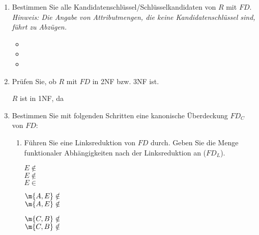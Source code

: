 \documentclass{bschlangaul-aufgabe}
\begin{document}
\begin{enumerate}


\item Bestimmen Sie alle Kandidatenschlüssel/Schlüsselkandidaten von $R$
mit $FD$. \textit{Hinweis: Die Angabe von Attributmengen, die keine
Kandidatenschlüssel sind, führt zu Abzügen.}

\begin{bAntwort}
\begin{itemize}
\item {}
\item {}
\item {}
\end{itemize}
\end{bAntwort}


\item Prüfen Sie, ob $R$ mit $FD$ in 2NF bzw. 3NF ist.

\begin{bAntwort}
$R$ ist in 1NF, da 
\end{bAntwort}


\item Bestimmen Sie mit folgenden Schritten eine kanonische Überdeckung
$FD_C$ von $FD$:

\begin{enumerate}


\item Führen Sie eine Linksreduktion von $FD$ durch. Geben Sie die Menge
funktionaler Abhängigkeiten nach der Linksreduktion an ($FD_L$).

\begin{bAntwort}


$E \notin$ \\
$E \notin$  \\
$E \in$ 


$\m{A, E} \notin$ \\
$\m{A, E} \notin$ 


$\m{C, B} \notin$ \\
$\m{C, B} \notin$ 


\end{bAntwort}
\end{enumerate}
\end{enumerate}
\end{document}
